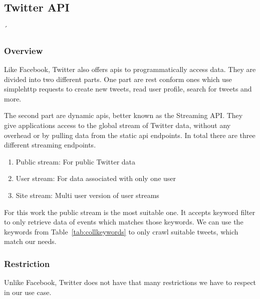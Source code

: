 \documentclass[11pt,titlepage,oneside,openany]{book}
\begin{document}
\subsection{Twitter API}´
\label{subsec:twapi}


\subsubsection{Overview}
\label{subsub:twoverview}


Like Facebook, Twitter also offers \acrshort{api}s to programmatically access data. They are divided into two different parts. One part are \acrfull{rest} conform ones which use simple\acrshort{http} requests to create new tweets, read user profile, search for tweets and more.
\par
\noindent The second part are dynamic \acrshort{api}s, better known as the Streaming API. They give applications access to the global stream of Twitter data, without any overhead or by pulling data from the static \acrshort{api} endpoints. In total there are three different streaming endpoints.

\begin{enumerate}
   \item Public stream: For public Twitter data
   \item User stream: For data associated with only one user
   \item Site stream: Multi user version of user streams
\end{enumerate}

For this work the public stream is the most suitable one. It accepts keyword filter to only retrieve data of events which matches those keywords. We can use the keywords from Table~\ref{tab:collkeywords} to only crawl suitable tweets, which match our needs. \cite{Twitter2012-05-15}

\subsubsection{Restriction}
\label{subsub:twrestrictions}

Unlike Facebook, Twitter does not have that many restrictions we have to respect in our use case.
\end{document}
